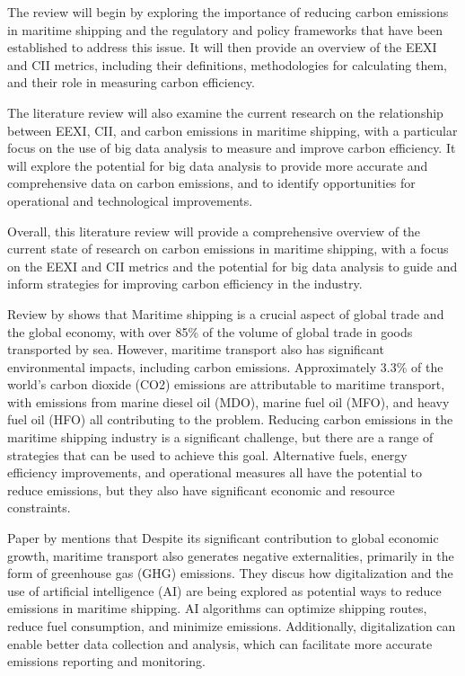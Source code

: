 The review will begin by exploring the importance of reducing carbon emissions in maritime shipping and the regulatory and policy frameworks that have been established to address this issue. It will then provide an overview of the EEXI and CII metrics, including their definitions, methodologies for calculating them, and their role in measuring carbon efficiency.

The literature review will also examine the current research on the relationship between EEXI, CII, and carbon emissions in maritime shipping, with a particular focus on the use of big data analysis to measure and improve carbon efficiency. It will explore the potential for big data analysis to provide more accurate and comprehensive data on carbon emissions, and to identify opportunities for operational and technological improvements.

Overall, this literature review will provide a comprehensive overview of the current state of research on carbon emissions in maritime shipping, with a focus on the EEXI and CII metrics and the potential for big data analysis to guide and inform strategies for improving carbon efficiency in the industry.



Review by \citeauthor{en15217910} \autocite{en15217910} shows that Maritime shipping is a crucial aspect of global trade and the global economy, with over 85\% of the volume of global trade in goods transported by sea.
However, maritime transport also has significant environmental impacts, including carbon emissions.
Approximately 3.3\% of the world's carbon dioxide (CO2) emissions are attributable to maritime transport, with emissions from marine diesel oil (MDO), marine fuel oil (MFO), and heavy fuel oil (HFO) all contributing to the problem.
Reducing carbon emissions in the maritime shipping industry is a significant challenge, but there are a range of strategies that can be used to achieve this goal.
Alternative fuels, energy efficiency improvements, and operational measures all have the potential to reduce emissions, but they also have significant economic and resource constraints.


Paper by \citeauthor{en15176150} \autocite{en15176150} mentions that  Despite its significant contribution to global economic growth, maritime transport also generates negative externalities, primarily in the form of greenhouse gas (GHG) emissions.
They discus how digitalization and the use of artificial intelligence (AI) are being explored as potential ways to reduce emissions in maritime shipping.
AI algorithms can optimize shipping routes, reduce fuel consumption, and minimize emissions. Additionally, digitalization can enable better data collection and analysis, which can facilitate more accurate emissions reporting and monitoring.

